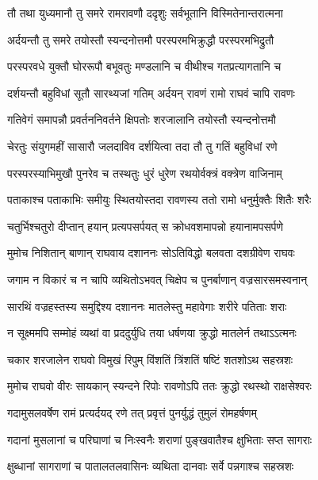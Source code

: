 
\twolineshloka
{तौ तथा युध्यमानौ तु समरे रामरावणौ}
{ददृशुः सर्वभूतानि विस्मितेनान्तरात्मना} %

\twolineshloka
{अर्दयन्तौ तु समरे तयोस्तौ स्यन्दनोत्तमौ}
{परस्परमभिक्रुद्धौ परस्परमभिद्रुतौ} %

\twolineshloka
{परस्परवधे युक्तौ घोररूपौ बभूवतुः}
{मण्डलानि च वीथीश्च गतप्रत्यागतानि च} %

\twolineshloka
{दर्शयन्तौ बहुविधां सूतौ सारथ्यजां गतिम्}
{अर्दयन् रावणं रामो राघवं चापि रावणः} %

\twolineshloka
{गतिवेगं समापन्नौ प्रवर्तननिवर्तने}
{क्षिपतोः शरजालानि तयोस्तौ स्यन्दनोत्तमौ} %

\twolineshloka
{चेरतुः संयुगमहीं सासारौ जलदाविव}
{दर्शयित्वा तदा तौ तु गतिं बहुविधां रणे} %

\twolineshloka
{परस्परस्याभिमुखौ पुनरेव च तस्थतुः}
{धुरं धुरेण रथयोर्वक्त्रं वक्त्रेण वाजिनाम्} %

\twolineshloka
{पताकाश्च पताकाभिः समीयुः स्थितयोस्तदा}
{रावणस्य ततो रामो धनुर्मुक्तैः शितैः शरैः} %

\twolineshloka
{चतुर्भिश्चतुरो दीप्तान् हयान् प्रत्यपसर्पयत्}
{स क्रोधवशमापन्नो हयानामपसर्पणे} %

\twolineshloka
{मुमोच निशितान् बाणान् राघवाय दशाननः}
{सोऽतिविद्धो बलवता दशग्रीवेण राघवः} %

\twolineshloka
{जगाम न विकारं च न चापि व्यथितोऽभवत्}
{चिक्षेप च पुनर्बाणान् वज्रसारसमस्वनान्} %

\twolineshloka
{सारथिं वज्रहस्तस्य समुद्दिश्य दशाननः}
{मातलेस्तु महावेगाः शरीरे पतिताः शराः} %

\twolineshloka
{न सूक्ष्ममपि सम्मोहं व्यथां वा प्रददुर्युधि}
{तया धर्षणया क्रुद्धो मातलेर्न तथाऽऽत्मनः} %

\twolineshloka
{चकार शरजालेन राघवो विमुखं रिपुम्}
{विंशतिं त्रिंशतिं षष्टिं शतशोऽथ सहस्रशः} %

\twolineshloka
{मुमोच राघवो वीरः सायकान् स्यन्दने रिपोः}
{रावणोऽपि ततः क्रुद्धो रथस्थो राक्षसेश्वरः} %

\twolineshloka
{गदामुसलवर्षेण रामं प्रत्यर्दयद् रणे}
{तत् प्रवृत्तं पुनर्युद्धं तुमुलं रोमहर्षणम्} %

\twolineshloka
{गदानां मुसलानां च परिघाणां च निःस्वनैः}
{शराणां पुङ्खवातैश्च क्षुभिताः सप्त सागराः} %

\twolineshloka
{क्षुब्धानां सागराणां च पातालतलवासिनः}
{व्यथिता दानवाः सर्वे पन्नगाश्च सहस्रशः} %

